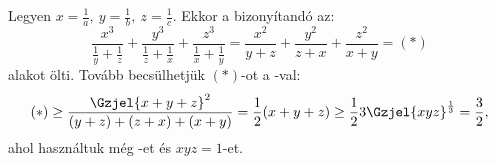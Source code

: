Legyen $x=\frac{1}{a},\ y=\frac{1}{b},\ z=\frac{1}{c}.$ Ekkor a bizonyítandó az:
$$
\frac{x^{3}}{\frac{1}{y}+\frac{1}{z}}+
\frac{y^{3}}{\frac{1}{z}+\frac{1}{x}}+
\frac{z^{3}}{\frac{1}{x}+\frac{1}{y}} =
\frac{x^{2}}{y+z}+
\frac{y^{2}}{z+x}+
\frac{z^{2}}{x+y}=(*)
$$
alakot ölti. Tovább becsülhetjük $(*)$-ot a -val:
$$
(*) \ge \frac{\Gzjel{x+y+z}^{2}}{(y+z)+(z+x)+(x+y)} = 
   \frac{1}{2}(x+y+z) \ge \frac{1}{2} 3\Gzjel{xyz}^{\frac{1}{3}}=\frac{3}{2}, 
$$
ahol használtuk még -et és $xyz=1$-et.
